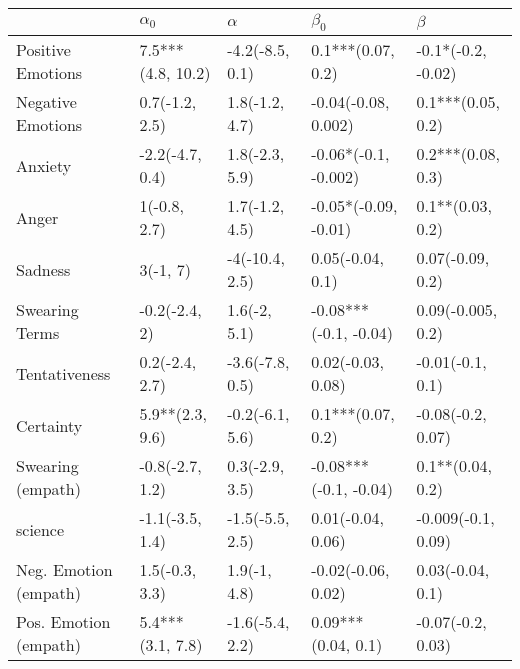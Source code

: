 \begin{tabular}{lllll}
\toprule
{} &         $\alpha_0$ &         $\alpha$ &              $\beta_0$ &             $\beta$ \\
\midrule
Positive Emotions     &  7.5***(4.8, 10.2) &  -4.2(-8.5, 0.1) &      0.1***(0.07, 0.2) &  -0.1*(-0.2, -0.02) \\
Negative Emotions     &     0.7(-1.2, 2.5) &   1.8(-1.2, 4.7) &    -0.04(-0.08, 0.002) &   0.1***(0.05, 0.2) \\
Anxiety               &    -2.2(-4.7, 0.4) &   1.8(-2.3, 5.9) &   -0.06*(-0.1, -0.002) &   0.2***(0.08, 0.3) \\
Anger                 &       1(-0.8, 2.7) &   1.7(-1.2, 4.5) &   -0.05*(-0.09, -0.01) &    0.1**(0.03, 0.2) \\
Sadness               &           3(-1, 7) &   -4(-10.4, 2.5) &       0.05(-0.04, 0.1) &    0.07(-0.09, 0.2) \\
Swearing Terms        &      -0.2(-2.4, 2) &     1.6(-2, 5.1) &  -0.08***(-0.1, -0.04) &   0.09(-0.005, 0.2) \\
Tentativeness         &     0.2(-2.4, 2.7) &  -3.6(-7.8, 0.5) &      0.02(-0.03, 0.08) &    -0.01(-0.1, 0.1) \\
Certainty             &    5.9**(2.3, 9.6) &  -0.2(-6.1, 5.6) &      0.1***(0.07, 0.2) &   -0.08(-0.2, 0.07) \\
Swearing (empath)     &    -0.8(-2.7, 1.2) &   0.3(-2.9, 3.5) &  -0.08***(-0.1, -0.04) &    0.1**(0.04, 0.2) \\
science               &    -1.1(-3.5, 1.4) &  -1.5(-5.5, 2.5) &      0.01(-0.04, 0.06) &  -0.009(-0.1, 0.09) \\
Neg. Emotion (empath) &     1.5(-0.3, 3.3) &     1.9(-1, 4.8) &     -0.02(-0.06, 0.02) &    0.03(-0.04, 0.1) \\
Pos. Emotion (empath) &   5.4***(3.1, 7.8) &  -1.6(-5.4, 2.2) &     0.09***(0.04, 0.1) &   -0.07(-0.2, 0.03) \\
\bottomrule
\end{tabular}
